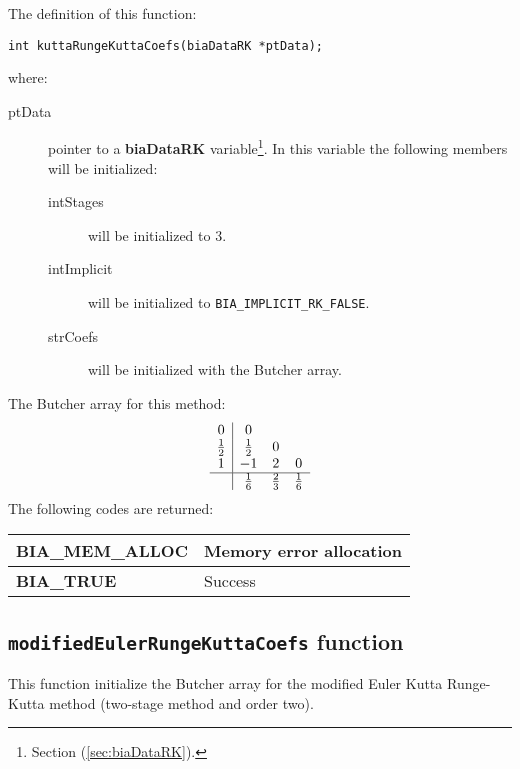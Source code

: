 The definition of this function:
%
\begin{verbatim}
int kuttaRungeKuttaCoefs(biaDataRK *ptData);
\end{verbatim} 
%
where:
%
\begin{description}
\item[ptData] pointer to a \textbf{biaDataRK} variable\footnote{Section (\ref{sec:biaDataRK}).}. In this variable the following members will be initialized:
%
\begin{description}
%    
\item[intStages] will be initialized to $3$.
%  
\item[intImplicit] will be initialized to \texttt{BIA\_IMPLICIT\_RK\_FALSE}.
%
\item[strCoefs] will be initialized with the Butcher array.
%  
\end{description}
%  
\end{description}
%
The Butcher array for this method:
%
\begin{displaymath}
\begin{array}{c|ccc}
0 & 0 \\
\frac{1}{2} & \frac{1}{2} & 0 \\
1 & -1 & 2 & 0 \\
\hline
 & \frac{1}{6} & \frac{2}{3} & \frac{1}{6}
\end{array}
\end{displaymath}
%
The following codes are returned:
%
\begin{center}
\begin{tabular}{|l|l|}
\hline
\textbf{BIA\_MEM\_ALLOC} & Memory error allocation \\
\hline
\textbf{BIA\_TRUE} & Success \\
\hline
\end{tabular}
\end{center}

\subsection{\texttt{modifiedEulerRungeKuttaCoefs} function}

This function initialize the Butcher array for the modified Euler Kutta Runge-Kutta method (two-stage method and order two).\\

